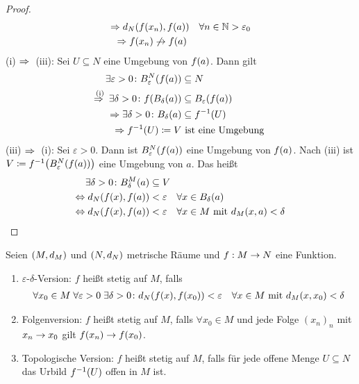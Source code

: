 \begin{satz}
\begin{proof}
\begin{align*}
            \impl d_N&\of{f\of{x_n}, f\of{a}}\quad\forall n\in\N > \varepsilon_0\\
            \impl f&\of{x_n} \not\fromto f\of{a}
        \end{align*}
        (i) $\Rightarrow{}$ (iii): Sei $U\subseteq N$ eine Umgebung von $f\of{a}$. Dann gilt
        \begin{align*}
            \exists\varepsilon > 0\colon B_{\varepsilon}^{N}\of{f\of{a}} &\subseteq N\\
            \annot{\impl}{(i)} \exists \delta > 0\colon f\of{B_{\delta}\of{a}} &\subseteq B_{\varepsilon}\of{f\of{a}}\\
            \impl \exists \delta > 0\colon B_{\delta}\of{a} &\subseteq f^{-1}\of{U}\\
            \impl f^{-1}\of{U} \coloneqq V &\text{ ist eine Umgebung }
        \end{align*}
        (iii) $\Rightarrow{}$ (i): Sei $\varepsilon > 0$. Dann ist $B_{\varepsilon}^{N}\of{f\of{a}}$ eine Umgebung von $f\of{a}$. Nach (iii) ist $V\coloneqq f^{-1}\of{B_{\varepsilon}^{N}\of{f\of{a}}}$ eine Umgebung von $a$. Das heißt
        \begin{align*}
            \exists\delta > 0\colon B_{\delta}^{M}\of{a} &\subseteq V\\
            \equivalent d_N\of{f\of{x}, f\of{a}} &< \varepsilon\quad\forall x\in B_{\delta}\of{a}\\
            \equivalent d_N\of{f\of{x}, f\of{a}} &< \varepsilon\quad\forall x\in M \text{ mit } d_M\of{x,a} < \delta\qedhere
        \end{align*}
    \end{proof}
\end{satz}

\begin{definition} %
    \label{definition:stetigkeit-vollst-metr}
    Seien $\left(M, d_M\right)$ und $\left(N, d_N\right)$ metrische Räume und $f: M\rightarrow{} N$ eine Funktion.
    \begin{enumerate}[label=(\alph*)]
        \item $\varepsilon$-$\delta$-Version: $f$ heißt stetig auf $M$, falls
        \begin{align*}
            \forall x_0\in M\fa \varepsilon > 0\ex \delta > 0\colon d_N\of{f\of{x}, f\of{x_0}} < \varepsilon\quad\forall x\in M \text{ mit } d_M\of{x, x_0} < \delta
        \end{align*}
        \item Folgenversion: $f$ heißt stetig auf $M$, falls $\forall x_0\in M$ und jede Folge $(x_n)_n$ mit $x_n\rightarrow{} x_0$ gilt $f\of{x_n}\fromto f\of{x_0}$.
        \item Topologische Version: $f$ heißt stetig auf $M$, falls für jede offene Menge $U\subseteq N$ das Urbild $f^{-1}\of{U}$ offen in $M$ ist.
    \end{enumerate}
\end{definition}

